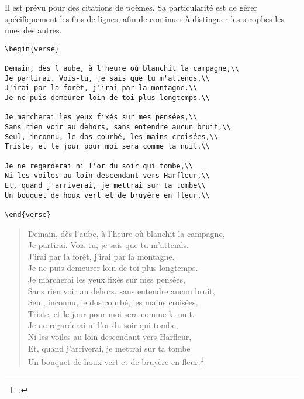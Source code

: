 Il est prévu pour des citations de poèmes. Sa particularité est de gérer spécifiquement les fins de lignes, afin de continuer à distinguer les strophes les unes des autres.

\begin{verbatim}
\begin{verse}

Demain, dès l'aube, à l'heure où blanchit la campagne,\\
Je partirai. Vois-tu, je sais que tu m'attends.\\
J'irai par la forêt, j'irai par la montagne.\\
Je ne puis demeurer loin de toi plus longtemps.\\

Je marcherai les yeux fixés sur mes pensées,\\
Sans rien voir au dehors, sans entendre aucun bruit,\\
Seul, inconnu, le dos courbé, les mains croisées,\\
Triste, et le jour pour moi sera comme la nuit.\\

Je ne regarderai ni l'or du soir qui tombe,\\
Ni les voiles au loin descendant vers Harfleur,\\
Et, quand j'arriverai, je mettrai sur ta tombe\\
Un bouquet de houx vert et de bruyère en fleur.\\

\end{verse}
\end{verbatim}

\begin{verse}


Demain, dès l'aube, à l'heure où blanchit la campagne,\\
Je partirai. Vois-tu, je sais que tu m'attends.\\
J'irai par la forêt, j'irai par la montagne.\\
Je ne puis demeurer loin de toi plus longtemps.\\

Je marcherai les yeux fixés sur mes pensées,\\
Sans rien voir au dehors, sans entendre aucun bruit,\\
Seul, inconnu, le dos courbé, les mains croisées,\\
Triste, et le jour pour moi sera comme la nuit.\\

Je ne regarderai ni l'or du soir qui tombe,\\
Ni les voiles au loin descendant vers Harfleur,\\
Et, quand j'arriverai, je mettrai sur ta tombe\\
Un bouquet de houx vert et de bruyère en fleur.\footcite{demain}\\

\end{verse}


